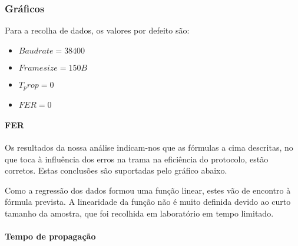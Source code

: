\subsubsection{Gráficos}

Para a recolha de dados, os valores por defeito são:

\begin{itemize}
    \item $Baudrate = 38400$
    \item $Framesize = 150 B$
    \item $T_prop = 0$
    \item $FER = 0$
\end{itemize}

\paragraph{FER}

Os resultados da nossa análise indicam-nos que as fórmulas a cima descritas, no que toca à influência dos erros na trama na eficiência do protocolo, estão corretos. Estas conclusões são suportadas pelo gráfico abaixo.

\begin{center}
\end{center}

Como a regressão dos dados formou uma função linear, estes vão de encontro à fórmula prevista. A linearidade da função não é muito definida devido ao curto tamanho da amostra, que foi recolhida em laboratório em tempo limitado.


\paragraph{Tempo de propagação}

